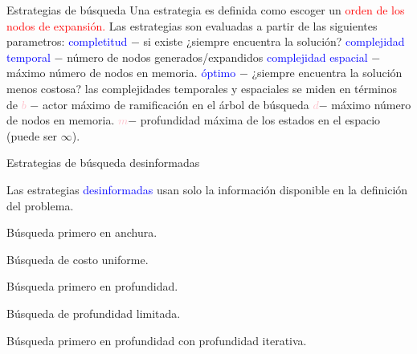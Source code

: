 \documentclass{beamer}
\theoremstyle{definition}
\theoremstyle{theorem}
\theoremstyle{remark}
\begin{document}
\begin{frame}{Estrategias de búsqueda}
Una estrategia es definida como escoger un  \textcolor{red}{orden de los nodos de expansión.} \newline
Las estrategias son evaluadas a partir de las siguientes parametros:\newline
\blank{1cm}\textcolor{blue}{completitud} $-$ si existe ¿siempre encuentra la solución? \newline
\blank{1cm}\textcolor{blue}{complejidad temporal} $-$ número de nodos generados/expandidos\newline
\blank{1cm}\textcolor{blue}{complejidad espacial} $-$ máximo número de nodos en memoria.\newline
\blank{1cm}\textcolor{blue}{óptimo} $-$ ¿siempre encuentra la solución menos costosa?\newline
las complejidades temporales y espaciales se miden en términos de\newline
\blank{1cm}\textcolor{pink}{$b$} $-$ actor máximo de ramificación en el árbol de búsqueda
\newline
\blank{1cm}\textcolor{pink}{$d$}$-$ máximo número de nodos en memoria.\newline
\blank{1cm}\textcolor{pink}{$m$}$-$ profundidad máxima de los estados en el espacio (puede ser $\infty$).\newline
\end{frame}

\begin{frame}{Estrategias de búsqueda desinformadas}

  
    Las estrategias \textcolor{blue}{desinformadas} usan solo la información disponible en la definición del problema.
    \bigskip
    \bigskip
    
    Búsqueda primero en anchura.
    \bigskip
    
    Búsqueda de costo uniforme.
    \bigskip
    
    Búsqueda primero en profundidad.
    \bigskip
    
    Búsqueda de profundidad limitada.
    \bigskip
    
    Búsqueda primero en profundidad con profundidad iterativa.

    
\end{frame}
\end{document}
